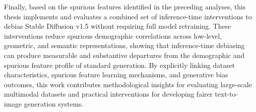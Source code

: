 Finally, based on the spurious features identified in the preceding analyses, this thesis implements and evaluates a combined set of inference-time interventions to debias Stable Diffusion v1.5 without requiring full model retraining. These interventions reduce spurious demographic correlations across low-level, geometric, and semantic representations, showing that inference-time debiasing can produce measurable and substantive departures from the demographic and spurious feature profile of standard generation. By explicitly linking dataset characteristics, spurious feature learning mechanisms, and generative bias outcomes, this work contributes methodological insights for evaluating large-scale multimodal datasets and practical interventions for developing fairer text-to-image generation systems.

